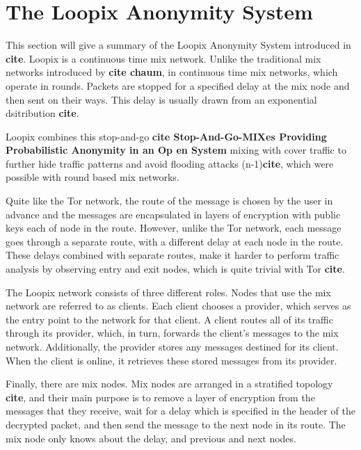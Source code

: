 \documentclass[a4paper,11pt,oneside]{report}
\begin{document}
\section{The Loopix Anonymity System}
\label{sec:loopix}
This section will give a summary of the Loopix Anonymity System introduced in \textbf{cite}. Loopix is a continuous time mix network. Unlike the traditional mix networks introduced by \textbf{cite chaum}, in continuous time mix networks, which operate in rounds. Packets are stopped for a specified delay at the mix node and then sent on their ways. This delay is usually drawn from an exponential dsitribution \textbf{cite}.

Loopix combines this stop-and-go \textbf{cite Stop-And-Go-MIXes Providing Probabilistic Anonymity in an Op en System} mixing with cover traffic to further hide traffic patterns and avoid flooding attacks (n-1)\textbf{cite}, which were possible with round based mix networks.

Quite like the Tor network, the route of the message is chosen by the user in advance and the messages are encapsulated in layers of encryption with public keys each of node in the route. However, unlike the Tor network, each message goes through a separate route, with a different delay at each node in the route. These delays combined with separate routes, make it harder to perform traffic analysis by observing entry and exit nodes, which is quite trivial with Tor \textbf{cite}.

The Loopix network consists of three different roles. Nodes that use the mix network are referred to as clients. Each client chooses a provider, which serves as the entry point to the network for that client. A client routes all of its traffic through its provider, which, in turn, forwards the client’s messages to the mix network. Additionally, the provider stores any messages destined for its client. When the client is online, it retrieves these stored messages from its provider.

Finally, there are mix nodes. Mix nodes are arranged in a stratified topology \textbf{cite}, and their main purpose is to remove a layer of encryption from the messages that they receive, wait for a delay which is specified in the header of the decrypted packet, and then send the message to the next node in its route. The mix node only knows about the delay, and previous and next nodes.
\end{document}
